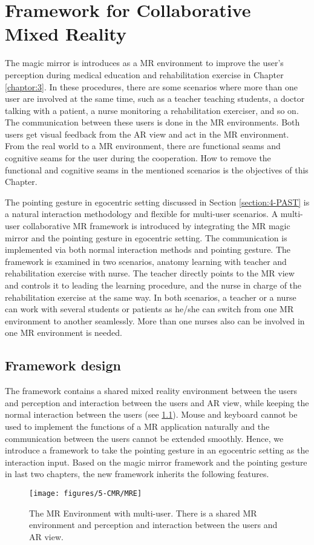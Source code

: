 \chapter{Framework for Collaborative Mixed Reality} \label{chaptor:5}
The magic mirror is introduces as a MR environment to improve the user's perception during medical education and rehabilitation exercise in Chapter \ref{chaptor:3}. In these procedures, there are some scenarios where more than one user are involved at the same time, such as a teacher teaching students, a doctor talking with a patient, a nurse monitoring a rehabilitation exerciser, and so on. The communication between these users is done in the MR environments. Both users get visual feedback from the AR view and act in the MR environment.  From the real world to a MR environment, there are functional seams and cognitive seams for the user during the cooperation. How to remove the functional and cognitive seams in the mentioned scenarios is the objectives of this Chapter.

The pointing gesture in egocentric setting discussed in Section \ref{section:4-PAST} is a natural interaction methodology and flexible for multi-user scenarios. A multi-user collaborative MR framework is introduced by integrating the MR magic mirror and the pointing gesture in egocentric setting.
The communication is implemented via both normal interaction methods and pointing gesture.
The framework is examined in two scenarios, anatomy learning with teacher and rehabilitation exercise with nurse. The teacher directly points to the MR view and controls it to leading the learning procedure, and the nurse in charge of the rehabilitation exercise at the same way. In both scenarios, a teacher or a nurse can work with several students or patients as he/she can switch from one MR environment to another seamlessly. More than one nurses also can be involved in one MR environment is needed. 

\section{Framework design} %
The framework contains a shared mixed reality environment between the users and perception and interaction between the users and AR view, while keeping the normal interaction between the users (see \figurename{\ref{fig:5:MRE}}). Mouse and keyboard cannot be used to implement the functions of a MR application naturally and the communication between the users cannot be extended smoothly. Hence, we introduce a framework to take the pointing gesture in an egocentric setting as the interaction input.
Based on the magic mirror framework and the pointing gesture in last two chapters, the new framework inherits the following features. 
\begin{figure} [htb]
\centering
\texttt{[image: figures/5-CMR/MRE]}
\caption{The MR Environment with multi-user. There is a shared MR environment and perception and interaction between the users and AR view.}
\label{fig:5:MRE}
\end{figure}
